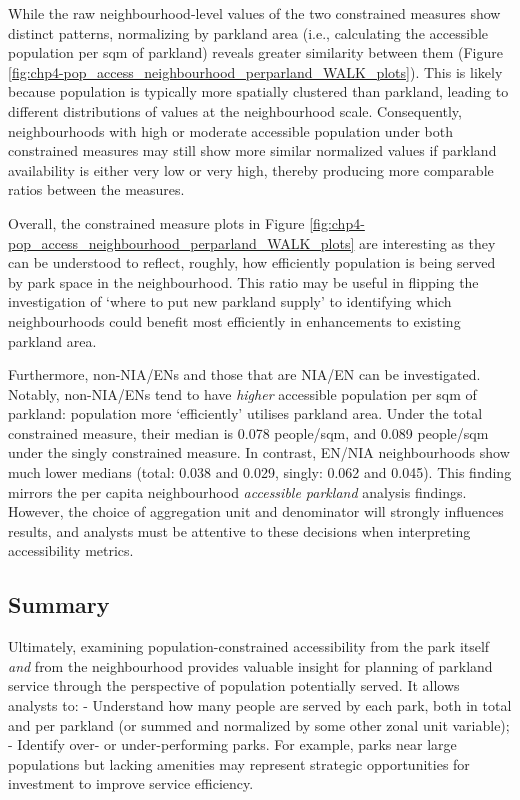 \documentclass[
11pt, %
oneside, %
english, %
singlespacing, %
]{macthesis} %
\begin{document}
While the raw neighbourhood-level values of the two constrained measures show distinct patterns, normalizing by parkland area (i.e., calculating the accessible population per sqm of parkland) reveals greater similarity between them (Figure \ref{fig:chp4-pop_access_neighbourhood_perparland_WALK_plots}). This is likely because population is typically more spatially clustered than parkland, leading to different distributions of values at the neighbourhood scale. Consequently, neighbourhoods with high or moderate accessible population under both constrained measures may still show more similar normalized values if parkland availability is either very low or very high, thereby producing more comparable ratios between the measures.

Overall, the constrained measure plots in Figure \ref{fig:chp4-pop_access_neighbourhood_perparland_WALK_plots} are interesting as they can be understood to reflect, roughly, how efficiently population is being served by park space in the neighbourhood. This ratio may be useful in flipping the investigation of `where to put new parkland supply' to identifying which neighbourhoods could benefit most efficiently in enhancements to existing parkland area.

Furthermore, non-NIA/ENs and those that are NIA/EN can be investigated. Notably, non-NIA/ENs tend to have \emph{higher} accessible population per sqm of parkland: population more `efficiently' utilises parkland area. Under the total constrained measure, their median is 0.078 people/sqm, and 0.089 people/sqm under the singly constrained measure. In contrast, EN/NIA neighbourhoods show much lower medians (total: 0.038 and 0.029, singly: 0.062 and 0.045). This finding mirrors the per capita neighbourhood \emph{accessible parkland} analysis findings. However, the choice of aggregation unit and denominator will strongly influences results, and analysts must be attentive to these decisions when interpreting accessibility metrics.

\subsection{Summary}\label{summary-1}

Ultimately, examining population-constrained accessibility from the park itself \emph{and} from the neighbourhood provides valuable insight for planning of parkland service through the perspective of population potentially served. It allows analysts to:
- Understand how many people are served by each park, both in total and per parkland (or summed and normalized by some other zonal unit variable);
- Identify over- or under-performing parks. For example, parks near large populations but lacking amenities may represent strategic opportunities for investment to improve service efficiency.
\end{document}
